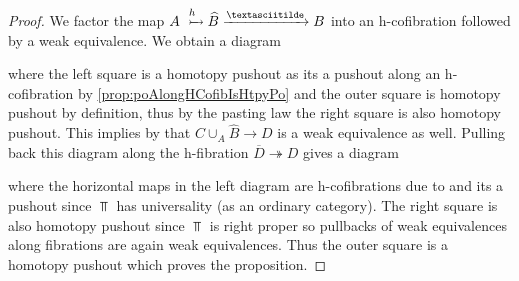 \begin{prop}
\begin{proof}
        We factor the map $A\xtailrightarrow{h}\widehat{B}\xrightarrow{\textasciitilde} B$ into an h-cofibration followed by a weak equivalence.
        We obtain a diagram 
        \begin{center}
        \end{center}
        where the left square is a homotopy pushout as its a pushout along an h-cofibration by \cref{prop:poAlongHCofibIsHtpyPo} and the outer square is homotopy pushout by definition, thus by the pasting law the right square is also homotopy pushout. 
        This implies by %
        that $C\cup_{A}\widehat{B}\to D$ is a weak equivalence as well.
        Pulling back this diagram along the h-fibration $\overline{D}\twoheadrightarrow D$ gives a diagram 
        \begin{center}
        \end{center}
        where the horizontal maps in the left diagram are h-cofibrations due to %
        and its a pushout since $\Top$ has universality (as an ordinary category). %
        The right square is also homotopy pushout since $\Top$ is right proper so pullbacks of weak equivalences along fibrations are again weak equivalences. 
        Thus the outer square is a homotopy pushout which proves the proposition. 
    \end{proof}
\end{prop}
